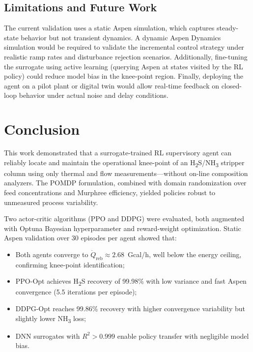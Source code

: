 \documentclass[journal,10pt,twocolumn]{IEEEtran}
\begin{document}
\subsection{Limitations and Future Work}
The current validation uses a static Aspen simulation, which captures steady-state behavior but not transient dynamics. A dynamic Aspen Dynamics simulation would be required to validate the incremental control strategy under realistic ramp rates and disturbance rejection scenarios. Additionally, fine-tuning the surrogate using active learning (querying Aspen at states visited by the RL policy) could reduce model bias in the knee-point region. Finally, deploying the agent on a pilot plant or digital twin would allow real-time feedback on closed-loop behavior under actual noise and delay conditions.

\section{Conclusion}
\label{sec:conclusion}

This work demonstrated that a surrogate-trained RL supervisory agent can reliably locate and maintain the operational knee-point of an H\textsubscript{2}S/NH\textsubscript{3} stripper column using only thermal and flow measurements---without on-line composition analyzers. The POMDP formulation, combined with domain randomization over feed concentrations and Murphree efficiency, yielded policies robust to unmeasured process variability.

Two actor-critic algorithms (PPO and DDPG) were evaluated, both augmented with Optuna Bayesian hyperparameter and reward-weight optimization. Static Aspen validation over 30 episodes per agent showed that:
\begin{itemize}
  \item Both agents converge to $\dot{Q}_\text{reb} \approx 2.68$~Gcal/h, well below the energy ceiling, confirming knee-point identification;
  \item PPO-Opt achieves H\textsubscript{2}S recovery of 99.98\% with low variance and fast Aspen convergence (5.5 iterations per episode);
  \item DDPG-Opt reaches 99.86\% recovery with higher convergence variability but slightly lower NH\textsubscript{3} loss;
  \item DNN surrogates with $R^2 > 0.999$ enable policy transfer with negligible model bias.
\end{itemize}
\end{document}
